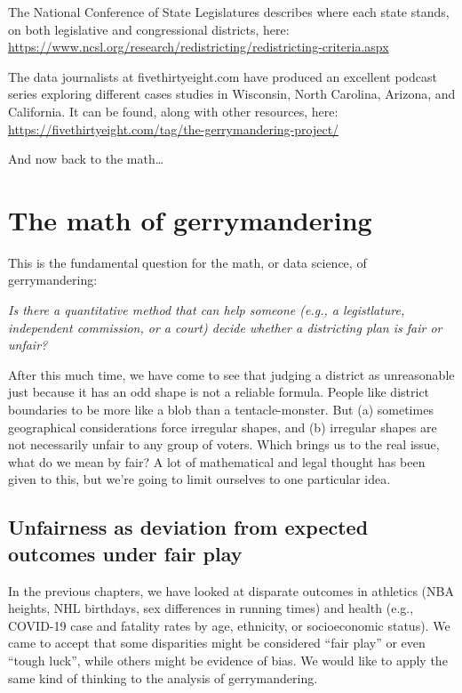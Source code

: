 \documentclass[
  openany]{book}
\begin{document}
The National Conference of State Legislatures describes where each state stands, on both legislative and congressional districts, here: \url{https://www.ncsl.org/research/redistricting/redistricting-criteria.aspx}

The data journalists at fivethirtyeight.com have produced an excellent podcast series exploring different cases studies in Wisconsin, North Carolina, Arizona, and California. It can be found, along with other resources, here:
\url{https://fivethirtyeight.com/tag/the-gerrymandering-project/}

And now back to the math\ldots{}

\hypertarget{the-math-of-gerrymandering}{%
\section*{The math of gerrymandering}\label{the-math-of-gerrymandering}}

This is the fundamental question for the math, or data science, of gerrymandering:

\emph{Is there a quantitative method that can help someone (e.g., a legistlature, independent commission, or a court) decide whether a districting plan is fair or unfair?}

After this much time, we have come to see that judging a district as unreasonable just because it has an odd shape is not a reliable formula. People like district boundaries to be more like a blob than a tentacle-monster. But (a) sometimes geographical considerations force irregular shapes, and (b) irregular shapes are not necessarily unfair to any group of voters. Which brings us to the real issue, what do we mean by fair? A lot of mathematical and legal thought has been given to this, but we're going to limit ourselves to one particular idea.

\hypertarget{unfairness-as-deviation-from-expected-outcomes-under-fair-play}{%
\subsection*{Unfairness as deviation from expected outcomes under fair play}\label{unfairness-as-deviation-from-expected-outcomes-under-fair-play}}

In the previous chapters, we have looked at disparate outcomes in athletics (NBA heights, NHL birthdays, sex differences in running times) and health (e.g., COVID-19 case and fatality rates by age, ethnicity, or socioeconomic status). We came to accept that some disparities might be considered ``fair play'' or even ``tough luck'', while others might be evidence of bias.
We would like to apply the same kind of thinking to the analysis of gerrymandering.
\end{document}

